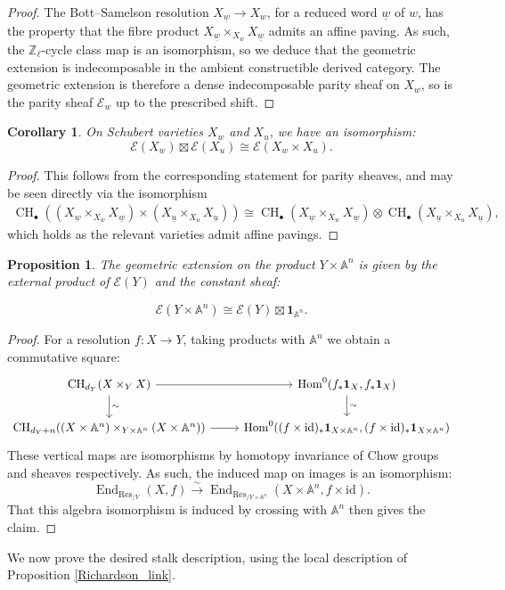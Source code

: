 \documentclass[11pt]{article}
\DeclareMathOperator{\Hom}{Hom}
\DeclareMathOperator{\End}{End}
\DeclareMathOperator{\id}{id}
\DeclareMathOperator{\CH}{\mathrm{CH}}
\newtheorem{cor}[thm]{Corollary}
\newtheorem{prop}[thm]{Proposition}
\theoremstyle{remark}
\theoremstyle{definition}
\begin{document}
\begin{proof}
The Bott--Samelson resolution $X_{\underline{w}}\to X_w$, for a reduced word $\underline{w}$ of $w$, has the property that the fibre product $X_{\underline{w}}\times_{X_w} X_{\underline{w}}$ admits an affine paving. As such, the $\mathbb{Z}_\ell$-cycle class map is an isomorphism, so we deduce that the geometric extension is indecomposable in the ambient constructible derived category. The geometric extension is therefore a dense indecomposable parity sheaf on $X_w$, so is the parity sheaf $\mathscr{E}_w$ up to the prescribed shift.
\end{proof}

\begin{cor}\label{cor:kunneth}
On Schubert varieties $X_w$ and $X_u$, we have an isomorphism: \[\mathscr{E}(X_w)\boxtimes \mathscr{E}(X_u)\cong \mathscr{E}(X_w\times X_u).\]
\end{cor}

\begin{proof}
This follows from the corresponding statement for parity sheaves, and may be seen directly via the isomorphism 
\begin{align*}
		\CH_\bullet((X_{\underline{w}}\times_{X_w} X_{\underline{w}})\times (X_{\underline{u}}\times_{X_u} X_{\underline{u}}))
		\cong \CH_\bullet(X_{\underline{w}}\times_{X_w} X_{\underline{w}})\otimes \CH_\bullet(X_{\underline{u}}\times_{X_u} X_{\underline{u}}),
\end{align*}
which holds as the relevant varieties admit affine pavings.
\end{proof}

\begin{prop}\label{prop:homotopy invariance}
The geometric extension on the product $Y\times \mathbb{A}^n$ is given by the external product of $\mathscr{E}(Y)$ and the constant sheaf:

\[\mathscr{E}(Y\times \mathbb{A}^n)\cong \mathscr{E}(Y)\boxtimes \mathbf{1}_{\mathbb{A}^n}.\]
\end{prop}

\begin{proof}
For a resolution $f:X\to Y$, taking products with $\mathbb{A}^n$ we obtain a commutative square:
\[\begin{tikzcd} \CH_{d_Y}(X\times_Y X)\arrow[r]\arrow[d,"\sim"]&\Hom^0(f_*\mathbf{1}_X,f_*\mathbf{1}_X)\arrow[d,"\sim"]\\
    \CH_{d_Y+n}((X\times \mathbb{A}^n)\times_{Y\times\mathbb{A}^n}(X\times \mathbb{A}^n))\arrow[r]&\Hom^0((f\times \id)_*\mathbf{1}_{X\times \mathbb{A}^n},(f\times \id)_*\mathbf{1}_{X\times \mathbb{A}^n})
    \end{tikzcd}\]
These vertical maps are isomorphisms by homotopy invariance of Chow groups and sheaves respectively. As such, the induced map on images is an isomorphism:
\[\End_{\text{Res}_{/Y}}(X,f)\xrightarrow{\sim} \End_{\text{Res}_{/{Y\times \mathbb{A}^n}}}(X\times \mathbb{A}^n,f\times \text{id}).\]
That this algebra isomorphism is induced by crossing with $\mathbb{A}^n$ then gives the claim.
\end{proof}
    We now prove the desired stalk description, using the local description of Proposition \ref{Richardson_link}.
\end{document}
